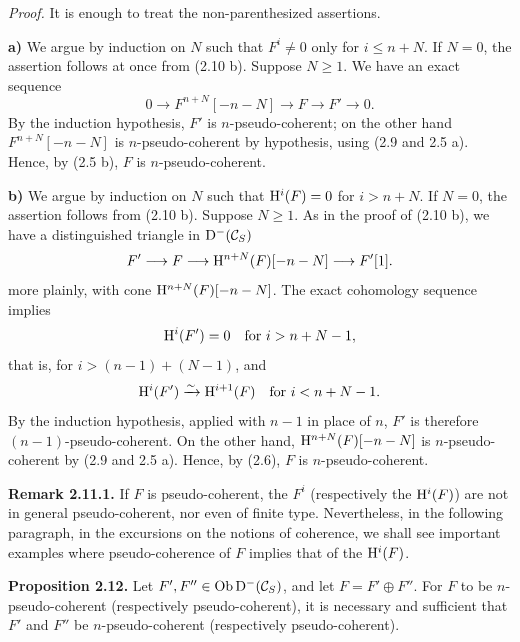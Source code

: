 \documentclass[11pt]{article}
\begin{document}
\emph{Proof.} It is enough to treat the non-parenthesized assertions.

\textbf{a)} We argue by induction on \(N\) such that \(F^i\neq0\) only for \(i\leq n+N\). If \(N=0\), the assertion follows at once from (2.10 b). Suppose \(N\geq1\). We have an exact sequence
\[
  0\longrightarrow F^{n+N}[-n-N]\longrightarrow F\longrightarrow F'\longrightarrow 0 .
\]
By the induction hypothesis, \(F'\) is \(n\)-pseudo-coherent; on the other hand \(F^{n+N}[-n-N]\) is \(n\)-pseudo-coherent by hypothesis, using (2.9 and 2.5 a). Hence, by (2.5 b), \(F\) is \(n\)-pseudo-coherent.

\textbf{b)} We argue by induction on \(N\) such that \(\mathrm H^i(F)=0\) for \(i>n+N\). If \(N=0\), the assertion follows from (2.10 b). Suppose \(N\geq1\). As in the proof of (2.10 b), we have a distinguished triangle in \(\mathrm D^-(\mathcal C_S)\)
\[
  F'\longrightarrow F\longrightarrow \mathrm H^{n+N}(F)[-n-N]\longrightarrow F'[1].
\]
more plainly, with cone \(\mathrm H^{n+N}(F)[-n-N]\). The exact cohomology sequence implies
\[
  \mathrm H^i(F')=0\quad\text{for } i>n+N-1,
\]
that is, for \(i>(n-1)+(N-1)\), and
\[
  \mathrm H^i(F')\xrightarrow{\sim} \mathrm H^{i+1}(F)\quad\text{for }i<n+N-1 .
\]
By the induction hypothesis, applied with \(n-1\) in place of \(n\), \(F'\) is therefore \((n-1)\)-pseudo-coherent. On the other hand, \(\mathrm H^{n+N}(F)[-n-N]\) is \(n\)-pseudo-coherent by (2.9 and 2.5 a). Hence, by (2.6), \(F\) is \(n\)-pseudo-coherent.

\textbf{Remark 2.11.1.} If \(F\) is pseudo-coherent, the \(F^i\) (respectively the \(\mathrm H^i(F)\)) are not in general pseudo-coherent, nor even of finite type. Nevertheless, in the following paragraph, in the excursions on the notions of coherence, we shall see important examples where pseudo-coherence of \(F\) implies that of the \(\mathrm H^i(F)\).

\textbf{Proposition 2.12.} Let \(F',F''\in\operatorname{Ob}\mathrm D^-(\mathcal C_S)\), and let \(F=F'\oplus F''\). For \(F\) to be \(n\)-pseudo-coherent (respectively pseudo-coherent), it is necessary and sufficient that \(F'
\) and \(F''\) be \(n\)-pseudo-coherent (respectively pseudo-coherent).
\end{document}
